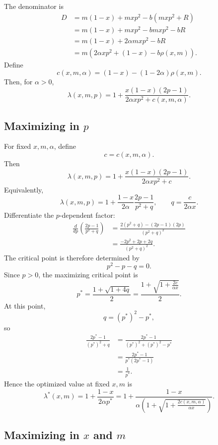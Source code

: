 \documentclass[11pt]{article}
\begin{document}
The denominator is
\[
\begin{aligned}
D
&=
m(1-x)+mxp^2-b(mx p^2+R) \\
&=
m(1-x)+mxp^2-bmxp^2-bR \\
&=
m(1-x)+2\alpha mxp^2-bR \\
&=
m\left(2\alpha xp^2+(1-x)-b\rho(x,m)\right).
\end{aligned}
\]
Define
\[
        c(x,m,\alpha)=(1-x)-(1-2\alpha)\rho(x,m).
\]
Then, for \(\alpha>0\),
\[
        \lambda(x,m,p)
        =
        1+
        \frac{x(1-x)(2p-1)}{2\alpha xp^2+c(x,m,\alpha)}.
\]

\subsection{Maximizing in \(p\)}

For fixed \(x,m,\alpha\), define
\[
        c=c(x,m,\alpha).
\]
Then
\[
        \lambda(x,m,p)
        =
        1+
        \frac{x(1-x)(2p-1)}{2\alpha xp^2+c}.
\]
Equivalently,
\[
        \lambda(x,m,p)
        =
        1+
        \frac{1-x}{2\alpha}
        \frac{2p-1}{p^2+q},
        \qquad
        q=\frac{c}{2\alpha x}.
\]
Differentiate the \(p\)-dependent factor:
\[
\begin{aligned}
\frac{d}{dp}\left(\frac{2p-1}{p^2+q}\right)
&=
\frac{2(p^2+q)-(2p-1)(2p)}{(p^2+q)^2} \\
&=
\frac{-2p^2+2p+2q}{(p^2+q)^2}.
\end{aligned}
\]
The critical point is therefore determined by
\[
        p^2-p-q=0.
\]
Since \(p>0\), the maximizing critical point is
\[
        p^*
        =
        \frac{1+\sqrt{1+4q}}{2}
        =
        \frac{1+\sqrt{1+\frac{2c}{\alpha x}}}{2}.
\]
At this point,
\[
        q=(p^*)^2-p^*,
\]
so
\[
\begin{aligned}
\frac{2p^*-1}{(p^*)^2+q}
&=
\frac{2p^*-1}{(p^*)^2+(p^*)^2-p^*}  \\
&=
\frac{2p^*-1}{p^*(2p^*-1)} \\
&=
\frac{1}{p^*}.
\end{aligned}
\]
Hence the optimized value at fixed \(x,m\) is
\[
\boxed{
        \lambda^*(x,m)
        =
        1+
        \frac{1-x}{2\alpha p^*}
        =
        1+
        \frac{1-x}{\alpha\left(1+\sqrt{1+\frac{2c(x,m,\alpha)}{\alpha x}}\right)}
        }.
\]

\subsection{Maximizing in \(x\) and \(m\)}
\end{document}
